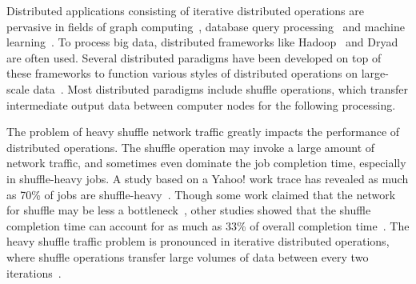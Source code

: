 \documentclass[10pt,journal,compsoc]{IEEEtran}
\begin{document}


Distributed applications consisting of iterative distributed operations are pervasive in fields of graph computing~\cite{Malewicz:2010:PSL, Lu:2014:LDG}, database query processing~\cite{thusoo2009hive,Yu:2008:DSG,Armbrust:2015:SSR} and machine learning~\cite{low2012distributed,kraska2013mlbase}.
To process big data,
distributed frameworks like Hadoop~\cite{dean2008mapreduce}%
and Dryad~\cite{isard2007dryad} are often used.
Several distributed paradigms have been developed on top of
these frameworks to function various styles of distributed operations on large-scale data~\cite{thusoo2009hive, Yu:2008:DSG, zaharia2012resilient}.
Most distributed paradigms include shuffle
operations, which transfer intermediate output data between computer nodes 
for the following processing.

The problem of heavy shuffle network traffic greatly impacts the performance of distributed operations. 
The shuffle operation may invoke a large amount of network traffic, 
and sometimes even dominate the job completion time, 
especially in shuffle-heavy jobs. 
A study based on a Yahoo! work trace has revealed as much as 70\% of 
jobs are shuffle-heavy~\cite{chen2011case}. 
Though some work claimed that the network for shuffle may
be less a bottleneck~\cite{Ousterhout2015MSP},
other studies showed that the shuffle completion
time can account for as much as 33\% of overall completion time~\cite{chowdhury2011managing, al2010hedera}.
The heavy shuffle traffic problem is pronounced in 
iterative distributed operations, 
where shuffle operations transfer large volumes of data between every two iterations~\cite{zaharia2012resilient}. 
\end{document}
